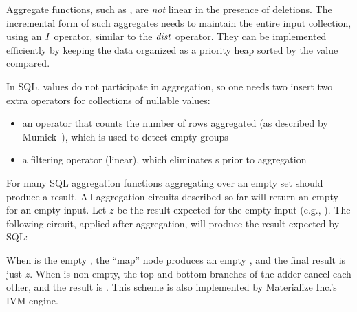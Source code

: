 Aggregate functions, such as , are \emph{not} linear in the
presence of deletions.  The incremental form of such aggregates needs
to maintain the entire input collection, using an $\mathit{I}$ operator,
similar to the $\mathit{dist}$ operator.  They can be implemented
efficiently by keeping the data organized as a priority heap sorted by
the value compared.

In SQL,  values do not participate in aggregation, so one
needs two insert two extra operators for collections of nullable
values:
\begin{itemize}
  \item an operator that counts the number of rows aggregated (as
    described by Mumick~\cite{mumick-sigmod97}), which is used to
    detect empty groups
  \item a filtering operator (linear), which eliminates s
    prior to aggregation
\end{itemize}

For many SQL aggregation functions aggregating over an empty set
should produce a  result.  All aggregation circuits
described so far will return an empty \zr for an empty input.  Let $z$
be the result expected for the empty input (e.g., ).  The
following circuit, applied after aggregation, will produce the result
expected by SQL:

\begin{center}
\end{center}

\noindent When  is the empty \zr, the ``map'' node produces
an empty \zr, and the final result is just $z$.  When  is
non-empty, the top and bottom branches of the adder cancel each other,
and the result is .  This scheme is also implemented by
Materialize Inc.'s IVM engine.

